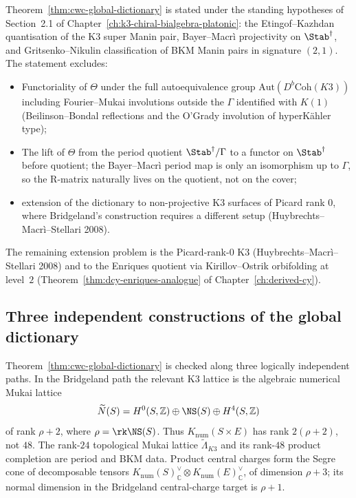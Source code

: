 \begin{remark}
\label{rem:cwc-scope}
Theorem~\ref{thm:cwc-global-dictionary} is stated under the standing
hypotheses of
Section~2.1 of Chapter~\ref{ch:k3-chiral-bialgebra-platonic}: the Etingof--Kazhdan
quantisation of the K3 super Manin pair, Bayer--Macr\`i projectivity on
$\Stab^\dagger$, and Gritsenko--Nikulin classification of BKM Manin
pairs in signature $(2,1)$. The statement excludes:
\begin{itemize}
\item Functoriality of $\Theta$ under the full autoequivalence group
 $\mathrm{Aut}(D^b\mathrm{Coh}(K3))$ including Fourier--Mukai
 involutions outside the $\Gamma$ identified with $K(1)$
 (Beilinson--Bondal reflections and the O'Grady involution of hyperK\"ahler
 type);
\item The lift of $\Theta$ from the period quotient
 $\Stab^\dagger/\Gamma$ to a functor on $\Stab^\dagger$ before
 quotient; the Bayer--Macr\`i period map is only an isomorphism up
 to $\Gamma$, so the R-matrix naturally lives on the quotient, not on
 the cover;
\item extension of the dictionary to non-projective K3 surfaces of
 Picard rank $0$, where Bridgeland's construction requires a
 different setup (Huybrechts--Macr\`i--Stellari 2008).
\end{itemize}
The remaining extension problem is the Picard-rank-$0$
K3 (Huybrechts--Macr\`i--Stellari 2008) and to the Enriques quotient
via Kirillov--Ostrik orbifolding at level~$2$
(Theorem~\ref{thm:dcy-enriques-analogue} of
Chapter~\ref{ch:derived-cy}).
\end{remark}

\subsection{Three independent constructions of the global dictionary}
\label{subsec:cwc-global-bridgeland-crossverif}

Theorem~\ref{thm:cwc-global-dictionary} is checked along three
logically independent paths. In the Bridgeland path the relevant K3
lattice is the algebraic numerical Mukai lattice
\[
 \widetilde{N}(S)=H^0(S,\mathbb{Z})\oplus\NS(S)\oplus H^4(S,\mathbb{Z})
\]
of rank $\rho+2$, where $\rho=\rk\NS(S)$. Thus
$K_{\mathrm{num}}(S\times E)$ has rank $2(\rho+2)$, not $48$. The
rank-$24$ topological Mukai lattice $\widetilde{\Lambda}_{K3}$ and its
rank-$48$ product completion are period and BKM data. Product central
charges form the Segre cone of decomposable tensors
$K_{\mathrm{num}}(S)^\vee_\mathbb{C}\otimes
K_{\mathrm{num}}(E)^\vee_\mathbb{C}$, of dimension $\rho+3$; its normal
dimension in the Bridgeland central-charge target is $\rho+1$.

